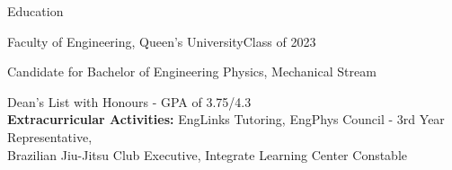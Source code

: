 \documentclass{resume} %
\begin{document}

\begin{rSection}{Education}

\begin{rSubsection}{Faculty of Engineering, Queen's University}{Class of 2023}{}{}
\item Candidate for Bachelor of Engineering Physics, Mechanical Stream
\item Dean's List with Honours - GPA of 3.75/4.3\\
\textbf{Extracurricular Activities:} EngLinks Tutoring, EngPhys Council - 3rd Year Representative,\\Brazilian Jiu-Jitsu Club Executive, Integrate Learning Center Constable

\end{rSubsection}
\end{rSection}





\end{document}
